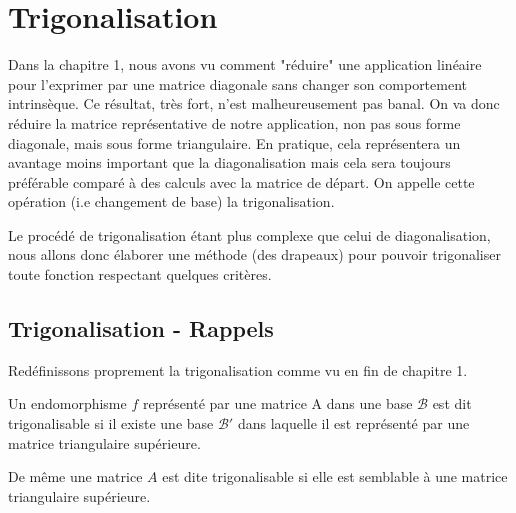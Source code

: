 \chapter{Trigonalisation}

\justify 

\setlength{\parindent}{0pt}



Dans la chapitre 1, nous avons vu comment "réduire" une application linéaire pour l'exprimer par une matrice diagonale 
sans changer son comportement intrinsèque. Ce résultat, très fort, n'est malheureusement pas banal. 
On va donc réduire la matrice représentative de notre application, non pas sous forme diagonale, mais sous forme triangulaire. 
En pratique, cela représentera un avantage moins important que la diagonalisation mais cela sera toujours préférable
comparé à des calculs avec la matrice de départ. On appelle cette opération (i.e changement de base) la trigonalisation. 

Le procédé de trigonalisation étant plus complexe que celui de diagonalisation, nous allons donc élaborer une méthode (des drapeaux)
pour pouvoir trigonaliser toute fonction respectant quelques critères. 



\section{Trigonalisation - Rappels}

Redéfinissons proprement la trigonalisation comme vu en fin de chapitre 1. 

\begin{definition}[Trigonalisation]
    Un endomorphisme $f$ représenté par une matrice A dans une base $\mathcal{B}$ est dit trigonalisable si 
    il existe une base $\mathcal{B}'$ dans laquelle il est représenté par une matrice triangulaire supérieure. 

    \vspace{0.3cm}

    De même une matrice $A$ est dite trigonalisable si elle est semblable à une matrice triangulaire supérieure. 
\end{definition}

